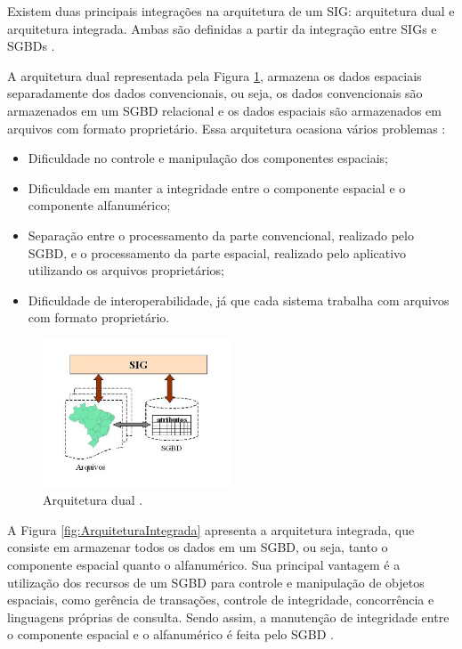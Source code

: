 Existem duas principais integrações na arquitetura de um SIG: arquitetura dual e arquitetura integrada. Ambas são definidas a partir da integração entre SIGs e SGBDs \cite{queirozferreira}.

A arquitetura dual representada pela Figura \ref{fig:ArquiteturaDual}, armazena os dados espaciais separadamente dos dados convencionais, ou seja, os dados convencionais são armazenados em um SGBD relacional e os dados espaciais são armazenados em arquivos com formato proprietário. Essa arquitetura ocasiona vários problemas \cite{queirozferreira}:

\begin{itemize}
\item Dificuldade no controle e manipulação dos componentes espaciais;
\item Dificuldade em manter a integridade entre o componente espacial e o componente alfanumérico;
\item Separação entre o processamento da parte convencional, realizado pelo SGBD, e o processamento da parte espacial, realizado pelo aplicativo utilizando os arquivos proprietários;
\item Dificuldade de interoperabilidade, já que cada sistema trabalha com arquivos com formato proprietário.
\end{itemize}

\begin{figure}[h]
\centering
\includegraphics[width=0.50\textwidth]{./img/cap_III/2-ArquiteturaDual}
\caption{Arquitetura dual \cite{queirozferreira}.}
\label{fig:ArquiteturaDual}
\end{figure}

A Figura \ref{fig:ArquiteturaIntegrada} apresenta a arquitetura integrada, que consiste em armazenar todos os dados em um SGBD, ou seja, tanto o componente espacial quanto o alfanumérico. Sua principal vantagem é a utilização dos recursos de um SGBD para controle e manipulação de objetos espaciais, como gerência de transações, controle de integridade, concorrência e linguagens próprias de consulta. Sendo assim, a manutenção de integridade entre o componente espacial e o alfanumérico é feita pelo SGBD \cite{queirozferreira}.

